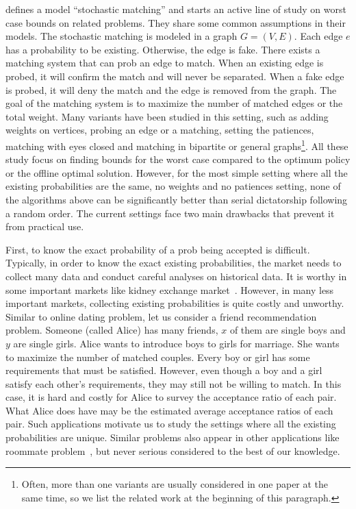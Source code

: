 \documentclass[letterpaper]{article}
\begin{document}
\cite{chen2009approximating} defines a model ``stochastic matching'' and starts an active line of study on worst case bounds on related problems\cite{adamczyk2011improved,costello2012stochastic,poloczek2012randomized,goel2012matching,bansal2012lp}.
They share some common assumptions in their models.
The stochastic matching is modeled in a graph $G=(V,E)$.
Each edge $e$ has a probability to be existing.
Otherwise, the edge is fake.
There exists a matching system that can prob an edge to match.
When an existing edge is probed, it will confirm the match and will never be separated.
When a fake edge is probed, it will deny the match and the edge is removed from the graph.
The goal of the matching system is to maximize the number of matched edges or the total weight. 
Many variants have been studied in this setting, such as adding weights on vertices, probing an edge or a matching, setting the patiences, matching with eyes closed and matching in bipartite or general graphs\footnote{Often, more than one variants are usually considered in one paper at the same time, so we list the related work at the beginning of this paragraph.}.
All these study focus on finding bounds for the worst case compared to the optimum policy or the offline optimal solution.
However, for the most simple setting where all the existing probabilities are the same, no weights and no patiences setting, none of the algorithms above can be significantly better than serial dictatorship following a random order.
The current settings face two main drawbacks that prevent it from practical use.

First, to know the exact probability of a prob being accepted is difficult.
Typically, in order to know the exact  existing probabilities, the market needs to collect many data and conduct careful analyses on historical data.
It is worthy in some important markets like kidney exchange market~\cite{dickerson2013failure,dickerson2015futurematch}.
However, in many less important markets, collecting existing probabilities is quite costly and unworthy.
Similar to online dating problem, let us consider a friend recommendation problem.
Someone (called Alice) has many friends, $x$ of them are single boys and $y$ are single girls.
Alice wants to introduce boys to girls for marriage.
She wants to maximize the number of matched couples.
Every boy or girl has some requirements that must be satisfied.
However, even though a boy and a girl satisfy each other's requirements, they may still not be willing to match.
In this case, it is hard and costly for Alice to survey the acceptance ratio of each pair.
What Alice does have may be the estimated average acceptance ratios of each pair.
Such applications motivate us to study the settings where all the existing probabilities are unique.
Similar problems also appear in other applications like roommate problem~\cite{roth1982incentive}, but never serious considered to the best of our knowledge.
\end{document}
